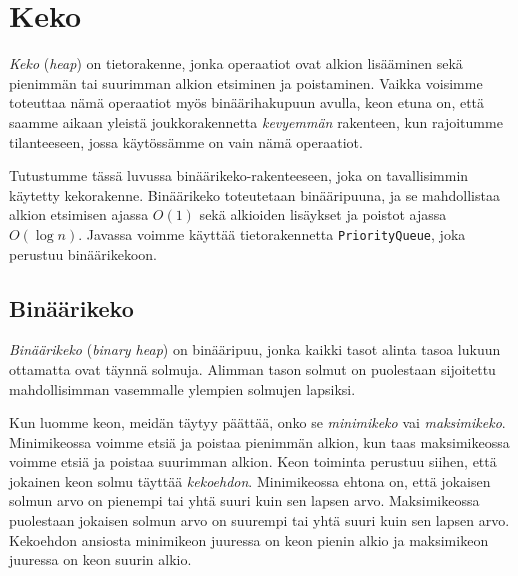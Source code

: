 \chapter{Keko}


\emph{Keko} (\emph{heap}) on tietorakenne, jonka operaatiot ovat
alkion lisääminen sekä
pienimmän tai suurimman alkion etsiminen ja poistaminen.
Vaikka voisimme toteuttaa nämä operaatiot myös
binäärihakupuun avulla, keon etuna on, että saamme aikaan
yleistä joukkorakennetta \emph{kevyemmän} rakenteen, kun
rajoitumme tilanteeseen, jossa käytössämme on vain nämä operaatiot.

Tutustumme tässä luvussa binäärikeko-rakenteeseen,
joka on tavallisimmin käytetty kekorakenne.
Binäärikeko toteutetaan binääripuuna,
ja se mahdollistaa alkion etsimisen ajassa $O(1)$ sekä
alkioiden lisäykset ja poistot ajassa $O(\log n)$.
Javassa voimme käyttää tietorakennetta \texttt{PriorityQueue},
joka perustuu binäärikekoon.

\section{Binäärikeko}


\emph{Binäärikeko} (\emph{binary heap}) on binääripuu, jonka kaikki tasot
alinta tasoa lukuun ottamatta ovat täynnä solmuja.
Alimman tason solmut on puolestaan sijoitettu
mahdollisimman vasemmalle ylempien solmujen lapsiksi.


Kun luomme keon, meidän täytyy päättää,
onko se \emph{minimikeko} vai \emph{maksimikeko}.
Minimikeossa voimme etsiä ja poistaa pienimmän alkion,
kun taas maksimikeossa voimme etsiä ja poistaa suurimman alkion.
Keon toiminta perustuu siihen, että jokainen
keon solmu täyttää \emph{kekoehdon}.
Minimikeossa ehtona on, että jokaisen solmun arvo on
pienempi tai yhtä suuri kuin sen lapsen arvo.
Maksimikeossa puolestaan jokaisen solmun arvo
on suurempi tai yhtä suuri kuin sen lapsen arvo.
Kekoehdon ansiosta minimikeon juuressa on keon
pienin alkio ja maksimikeon juuressa on keon suurin alkio.

